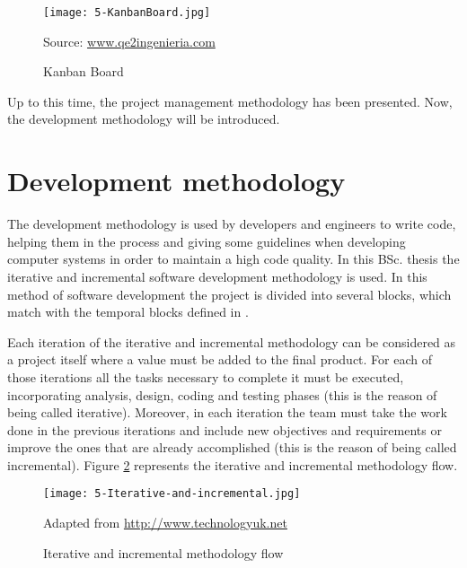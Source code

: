 \begin{figure}[!h]
	\begin{center}
		\texttt{[image: 5-KanbanBoard.jpg]}
		\caption{Kanban Board}
		\label{fig:5-KanbanBoard}{Source: \url{www.qe2ingenieria.com}}
	\end{center}
\end{figure}

Up to this time, the project management methodology has been presented. Now, the development methodology will be introduced.


\section{Development methodology}
The development methodology is used by developers and engineers to write code, helping them in the process and giving some guidelines when developing computer systems in order to maintain a high code quality. In this \ac{BSc.} thesis the iterative and incremental software development methodology is used. In this method of software development the project is divided into several blocks, which match with the temporal blocks defined in  \cite{ItIncr}. 

Each iteration of the iterative and incremental methodology can be considered as a project itself where a value must be added to the final product. For each of those iterations all the tasks necessary to complete it must be executed, incorporating analysis, design, coding and testing phases (this is the reason of being called iterative). Moreover, in each iteration the team must take the work done in the previous iterations and include new objectives and requirements or improve the ones that are already accomplished (this is the reason of being called incremental). Figure \ref{fig:5-Iterative-and-incremental} represents the iterative and incremental methodology flow.

\begin{figure}[!h]
	\begin{center}
		\texttt{[image: 5-Iterative-and-incremental.jpg]}
		\caption{Iterative and incremental methodology flow}
		\label{fig:5-Iterative-and-incremental}{Adapted from  \url{http://www.technologyuk.net}}
	\end{center}
\end{figure}

